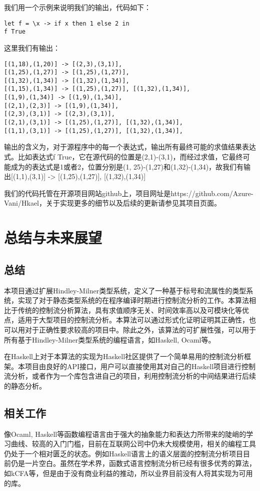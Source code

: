 \documentclass[UTF8, colorlinks]{pkuthss}
\begin{document}
	我们用一个示例来说明我们的输出，代码如下：
	\begin{lstlisting}
let f = \x -> if x then 1 else 2 in
f True
	\end{lstlisting}
	这里我们有输出：
	\begin{lstlisting}
[(1,18),(1,20)] -> [(2,3),(3,1)],
[(1,25),(1,27)] -> [(1,25),(1,27)],
[(1,32),(1,34)] -> [(1,32),(1,34)],
[(1,15),(1,34)] -> [(1,25),(1,27)], [(1,32),(1,34)],
[(1,9),(1,34)] -> [(1,9),(1,34)],
[(2,1),(2,3)] -> [(1,9),(1,34)],
[(2,3),(3,1)] -> [(2,3),(3,1)],
[(2,1),(3,1)] -> [(1,25),(1,27)], [(1,32),(1,34)],
[(1,1),(3,1)] -> [(1,25),(1,27)], [(1,32),(1,34)],
	\end{lstlisting}
	输出的含义为，对于源程序中的每一个表达式，输出所有最终可能的求值结果表达式。比如表达式f True，它在源代码的位置是(2,1)-(3,1)，而经过求值，它最终可能成为的表达式是1或者2，位置分别是(1, 25)-(1,27)和(1,32)-(1,34)，故我们有输出[(1,1),(3,1)] -> [(1,25),(1,27)], [(1,32),(1,34)]
	
	我们的代码托管在开源项目网站github上，项目网址是https://github.com/Azure-Vani/Hkael，关于实现更多的细节以及后续的更新请参见其项目页面。
	
	\chapter{总结与未来展望}
	\section{总结}
	本项目通过扩展Hindley-Milner类型系统，定义了一种基于标号和流属性的类型系统，实现了对于静态类型系统的在程序编译时期进行控制流分析的工作。本算法相比于传统的控制流分析算法，具有求值顺序无关、时间效率高以及可模块化等优点，适用于大型项目的控制流分析。本算法可以通过形式化证明证明其正确性，也可以用对于正确性要求较高的项目中。除此之外，该算法的可扩展性强，可以用于所有基于Hindley-Milner类型系统的编程语言，如Haskell, Ocaml等。
	
	在Haskell上对于本算法的实现为Haskell社区提供了一个简单易用的控制流分析框架。本项目由良好的API接口，用户可以直接使用其对自己的Haskell项目进行控制流分析，或者作为一个库包含进自己的项目，利用控制流分析的中间结果进行后续的静态分析。
	\section{相关工作}
	像Ocaml, Haskell等函数编程语言由于强大的抽象能力和表达力所带来的陡峭的学习曲线、较高的入门门槛，目前在互联网公司中仍未大规模使用，相关的编程工具仍处于一个相对匮乏的状态。例如Haskell语言上的语义层面的控制流分析项目目前仍是一片空白。虽然在学术界，函数式语言控制流分析已经有很多优秀的算法，如kCFA等，但是由于没有商业利益的推动，所以业界目前没有人将其实现为可用的库。
	
\end{document}
